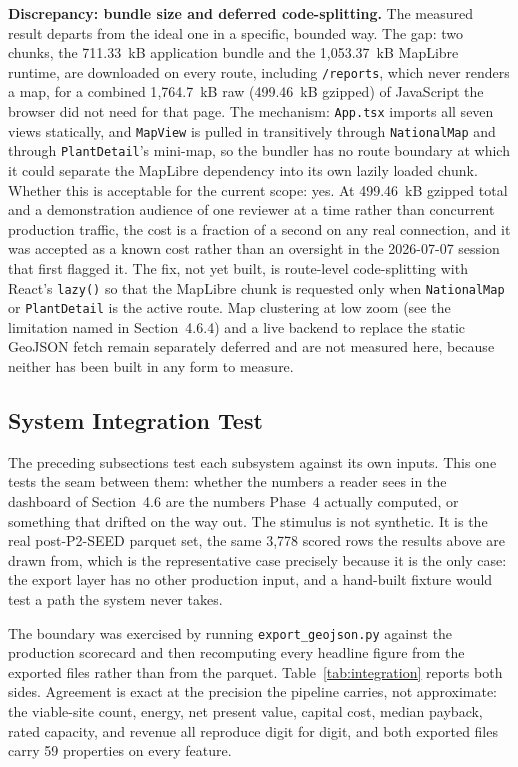 \documentclass[12pt,letterpaper]{report}
\begin{document}
\textbf{Discrepancy: bundle size and deferred code-splitting.} The
measured result departs from the ideal one in a specific, bounded way.
The gap: two chunks, the 711.33~kB application bundle and the
1{,}053.37~kB MapLibre runtime, are downloaded on every route, including
\texttt{/reports}, which never renders a map, for a combined 1{,}764.7~kB
raw (499.46~kB gzipped) of JavaScript the browser did not need for that
page. The mechanism: \texttt{App.tsx} imports all seven views statically,
and \texttt{MapView} is pulled in transitively through
\texttt{NationalMap} and through \texttt{PlantDetail}'s mini-map, so the
bundler has no route boundary at which it could separate the MapLibre
dependency into its own lazily loaded chunk. Whether this is acceptable
for the current scope: yes. At 499.46~kB gzipped total and a demonstration
audience of one reviewer at a time rather than concurrent production
traffic, the cost is a fraction of a second on any real connection, and it
was accepted as a known cost rather than an oversight in the
2026-07-07 session that first flagged it. The fix, not yet built, is
route-level code-splitting with React's \texttt{lazy()} so that the
MapLibre chunk is requested only when \texttt{NationalMap} or
\texttt{PlantDetail} is the active route. Map clustering at low zoom (see
the limitation named in Section~4.6.4) and a live backend to replace the
static GeoJSON fetch remain separately deferred and are not measured
here, because neither has been built in any form to measure.

\subsection{System Integration Test}                     %

The preceding subsections test each subsystem against its own inputs. This one tests
the seam between them: whether the numbers a reader sees in the dashboard of
Section~4.6 are the numbers Phase~4 actually computed, or something that drifted on
the way out. The stimulus is not synthetic. It is the real post-P2-SEED parquet set,
the same 3{,}778 scored rows the results above are drawn from, which is the
representative case precisely because it is the only case: the export layer has no
other production input, and a hand-built fixture would test a path the system never
takes.

The boundary was exercised by running \texttt{export\_geojson.py} against the
production scorecard and then recomputing every headline figure from the exported
files rather than from the parquet. Table~\ref{tab:integration} reports both sides.
Agreement is exact at the precision the pipeline carries, not approximate: the
viable-site count, energy, net present value, capital cost, median payback, rated
capacity, and revenue all reproduce digit for digit, and both exported files carry 59
properties on every feature.
\end{document}

